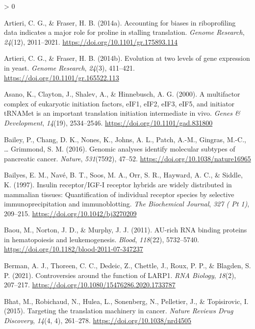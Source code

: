 \documentclass[
  12pt,
  openany]{book}
\newlength{\cslhangindent}
\newenvironment{CSLReferences}[2] %
 {%
  \setlength{\parindent}{0pt}
  \ifodd #1 \everypar{\setlength{\hangindent}{\cslhangindent}}\ignorespaces\fi
  \ifnum #2 > 0
  \setlength{\parskip}{#2\baselineskip}
  \fi
 }%
 {}
\begin{document}
\begin{CSLReferences}{1}{0}
\leavevmode\hypertarget{ref-Artieri2014a}{}%
Artieri, C. G., \& Fraser, H. B. (2014a). Accounting for biases in riboprofiling data indicates a major role for proline in stalling translation. \emph{Genome Research}, \emph{24}(12), 2011--2021. \url{https://doi.org/10.1101/gr.175893.114}

\leavevmode\hypertarget{ref-Artieri2014}{}%
Artieri, C. G., \& Fraser, H. B. (2014b). Evolution at two levels of gene expression in yeast. \emph{Genome Research}, \emph{24}(3), 411--421. \url{https://doi.org/10.1101/gr.165522.113}

\leavevmode\hypertarget{ref-Asano2000}{}%
Asano, K., Clayton, J., Shalev, A., \& Hinnebusch, A. G. (2000). A multifactor complex of eukaryotic initiation factors, {eIF1}, {eIF2}, {eIF3}, {eIF5}, and initiator {tRNAMet} is an important translation initiation intermediate in vivo. \emph{Genes \& Development}, \emph{14}(19), 2534--2546. \url{https://doi.org/10.1101/gad.831800}

\leavevmode\hypertarget{ref-Bailey2016}{}%
Bailey, P., Chang, D. K., Nones, K., Johns, A. L., Patch, A.-M., Gingras, M.-C., \ldots{} Grimmond, S. M. (2016). Genomic analyses identify molecular subtypes of pancreatic cancer. \emph{Nature}, \emph{531}(7592), 47--52. \url{https://doi.org/10.1038/nature16965}

\leavevmode\hypertarget{ref-Bailyes1997}{}%
Bailyes, E. M., Navé, B. T., Soos, M. A., Orr, S. R., Hayward, A. C., \& Siddle, K. (1997). Insulin receptor/{IGF}-{I} receptor hybrids are widely distributed in mammalian tissues: Quantification of individual receptor species by selective immunoprecipitation and immunoblotting. \emph{The Biochemical Journal}, \emph{327 ( Pt 1)}, 209--215. \url{https://doi.org/10.1042/bj3270209}

\leavevmode\hypertarget{ref-Baou2011}{}%
Baou, M., Norton, J. D., \& Murphy, J. J. (2011). {AU}-rich {RNA} binding proteins in hematopoiesis and leukemogenesis. \emph{Blood}, \emph{118}(22), 5732--5740. \url{https://doi.org/10.1182/blood-2011-07-347237}

\leavevmode\hypertarget{ref-Berman2021}{}%
Berman, A. J., Thoreen, C. C., Dedeic, Z., Chettle, J., Roux, P. P., \& Blagden, S. P. (2021). Controversies around the function of {LARP1}. \emph{RNA Biology}, \emph{18}(2), 207--217. \url{https://doi.org/10.1080/15476286.2020.1733787}

\leavevmode\hypertarget{ref-Bhat2015}{}%
Bhat, M., Robichaud, N., Hulea, L., Sonenberg, N., Pelletier, J., \& Topisirovic, I. (2015). Targeting the translation machinery in cancer. \emph{Nature Reviews Drug Discovery}, \emph{14}(4, 4), 261--278. \url{https://doi.org/10.1038/nrd4505}


\end{CSLReferences}
\end{document}
